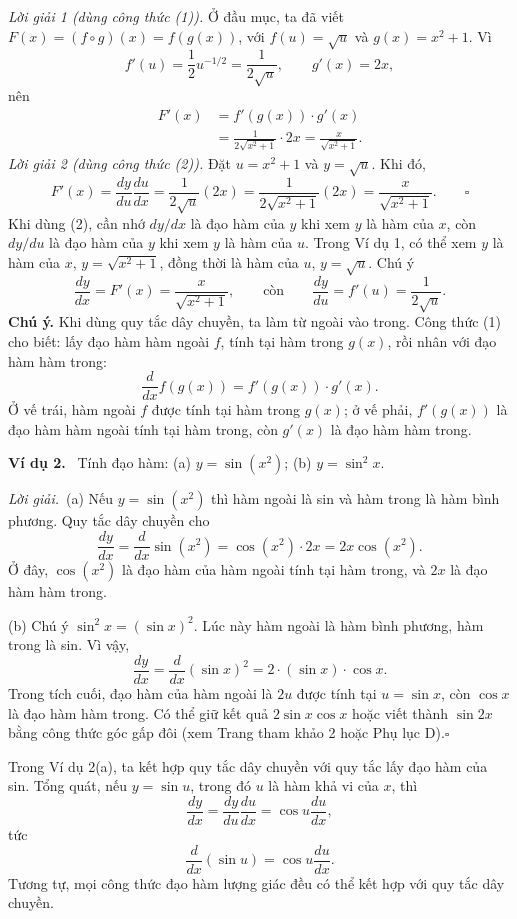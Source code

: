 \documentclass[12pt,a4paper]{article}
\newcommand{\ex}[1]{\par\medskip\noindent\textbf{Ví dụ #1.}\ }
\newcommand{\sol}{\par\nopagebreak[4]\noindent\textit{Lời giải.}\ }
\begin{document}
\noindent\textit{Lời giải 1 (dùng công thức (1)).} Ở đầu mục, ta đã viết $F(x)=(f\circ g)(x)=f(g(x))$, với $f(u)=\sqrt u$ và $g(x)=x^2+1$. Vì
\[f'(u)=\frac12u^{-1/2}=\frac1{2\sqrt u},\qquad g'(x)=2x,\]
nên
\begin{align*}
F'(x)&=f'(g(x))\cdot g'(x)\\
&=\frac1{2\sqrt{x^2+1}}\cdot2x=\frac{x}{\sqrt{x^2+1}}.
\end{align*}
\noindent\textit{Lời giải 2 (dùng công thức (2)).} Đặt $u=x^2+1$ và $y=\sqrt u$. Khi đó,
\[F'(x)=\frac{dy}{du}\frac{du}{dx}=\frac1{2\sqrt u}(2x)=\frac1{2\sqrt{x^2+1}}(2x)=\frac{x}{\sqrt{x^2+1}}.\qquad\square\]
Khi dùng (2), cần nhớ $dy/dx$ là đạo hàm của $y$ khi xem $y$ là hàm của $x$, còn $dy/du$ là đạo hàm của $y$ khi xem $y$ là hàm của $u$. Trong Ví dụ 1, có thể xem $y$ là hàm của $x$, $y=\sqrt{x^2+1}$, đồng thời là hàm của $u$, $y=\sqrt u$. Chú ý
\[\frac{dy}{dx}=F'(x)=\frac{x}{\sqrt{x^2+1}},\qquad\text{còn}\qquad \frac{dy}{du}=f'(u)=\frac1{2\sqrt u}.\]
\noindent\textbf{Chú ý.} Khi dùng quy tắc dây chuyền, ta làm từ ngoài vào trong. Công thức (1) cho biết: lấy đạo hàm hàm ngoài $f$, tính tại hàm trong $g(x)$, rồi nhân với đạo hàm hàm trong:
\[\frac{d}{dx}f(g(x))=f'(g(x))\cdot g'(x).\]
Ở vế trái, hàm ngoài $f$ được tính tại hàm trong $g(x)$; ở vế phải, $f'(g(x))$ là đạo hàm hàm ngoài tính tại hàm trong, còn $g'(x)$ là đạo hàm hàm trong.
\ex{2} Tính đạo hàm: (a) $y=\sin(x^2)$; \quad (b) $y=\sin^2x$.
\sol (a) Nếu $y=\sin(x^2)$ thì hàm ngoài là sin và hàm trong là hàm bình phương. Quy tắc dây chuyền cho
\[\frac{dy}{dx}=\frac{d}{dx}\sin(x^2)=\cos(x^2)\cdot2x=2x\cos(x^2).\]
Ở đây, $\cos(x^2)$ là đạo hàm của hàm ngoài tính tại hàm trong, và $2x$ là đạo hàm hàm trong.

(b) Chú ý $\sin^2x=(\sin x)^2$. Lúc này hàm ngoài là hàm bình phương, hàm trong là sin. Vì vậy,
\[\frac{dy}{dx}=\frac{d}{dx}(\sin x)^2=2\cdot(\sin x)\cdot\cos x.\]
Trong tích cuối, đạo hàm của hàm ngoài là $2u$ được tính tại $u=\sin x$, còn $\cos x$ là đạo hàm hàm trong. Có thể giữ kết quả $2\sin x\cos x$ hoặc viết thành $\sin2x$ bằng công thức góc gấp đôi (xem Trang tham khảo 2 hoặc Phụ lục D).\hfill$\square$

Trong Ví dụ 2(a), ta kết hợp quy tắc dây chuyền với quy tắc lấy đạo hàm của sin. Tổng quát, nếu $y=\sin u$, trong đó $u$ là hàm khả vi của $x$, thì
\[\frac{dy}{dx}=\frac{dy}{du}\frac{du}{dx}=\cos u\frac{du}{dx},\]
tức
\[\frac{d}{dx}(\sin u)=\cos u\frac{du}{dx}.\]
Tương tự, mọi công thức đạo hàm lượng giác đều có thể kết hợp với quy tắc dây chuyền.
\end{document}
